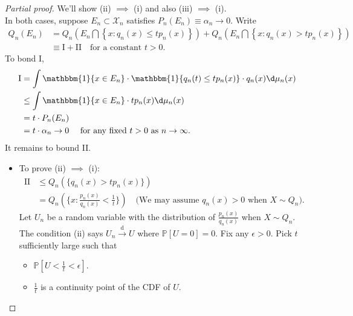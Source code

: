 \documentclass[a4paper]{article}
\begin{document}
\begin{proof}[Partial proof]
	We'll show (ii) $\implies$ (i) and also (iii) $\implies$ (i). \\
	In both cases, suppose $E_n \subset \mathcal{X}_n$ satisfies $P_n(E_n) \equiv \alpha_n \to 0$. Write
	\begin{equation*}
		\begin{aligned}
			Q_n(E_n) &= Q_n \left(E_n \bigcap \left\{x: q_n(x) \leq t p_n(x)\right\}\right) + Q_n \left(E_n \bigcap \left\{x: q_n(x) > t p_n(x)\right\}\right) \\
			&\equiv \text{I} + \text{II} \quad \text{for a constant } t > 0.
		\end{aligned}
	\end{equation*}
	To bond I,
	\begin{equation*}
		\begin{aligned}
			\text{I} &= \int \mathbbm{1}\{x \in E_n\} \cdot \mathbbm{1}\{q_n(t) \leq tp_n(x)\} \cdot q_n(x) \d \mu_n (x) \\
			&\leq \int \mathbbm{1}\{x \in E_n\} \cdot tp_n(x) \d \mu_n (x) \\
			&= t \cdot P_n(E_n) \\
			&= t \cdot \alpha_n \to 0 \quad \text{ for any fixed } t > 0 \text{ as } n \to \infty.
		\end{aligned}
	\end{equation*}
	\newline
	It remains to bound II.
	\begin{itemize}
		\item To prove (ii) $\implies$ (i):
		\begin{equation*}
			\begin{aligned}
				\text{II} &\leq Q_n \left(\{q_n(x) > tp_n(x)\}\right) \\
				&= Q_n \left(\{x: \frac{p_n(x)}{q_n(x)} < \frac{1}{t}\}\right) \quad \text{(We may assume $q_n(x) > 0$ when $X \sim Q_n$)}.
			\end{aligned}
		\end{equation*}
		Let $U_n$ be a random variable with the distribution of $\frac{p_n(x)}{q_n(x)}$ when $X \sim Q_n$. The condition (ii) says $U_n \stackrel{\text{d}}{\longrightarrow} U$ where $\mathbb{P}[U = 0] = 0$. Fix any $\epsilon > 0$. Pick $t$ sufficiently large such that
		\begin{itemize}
			\item $\mathbb{P}\left[U < \frac{1}{t} < \epsilon\right]$.
			\item $\frac{1}{t}$ is a continuity point of the CDF of $U$.

\end{itemize}
\end{itemize}
\end{proof}
\end{document}
